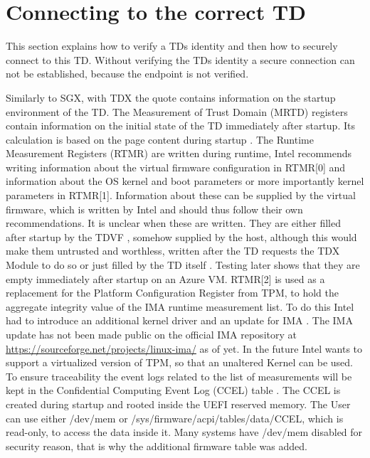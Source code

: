 \section{Connecting to the correct TD}

This section explains how to verify a TDs identity and then how to securely connect to this TD. Without verifying the TDs identity a secure connection can not be established, because the endpoint is not verified.


\label{Identity}
Similarly to \Gls{SGX}, with \Gls{TDX} the quote contains information on the startup environment of the TD. The Measurement of Trust Domain (MRTD) registers contain information on the initial state of the TD immediately after startup. Its calculation is based on the page content during startup \cite{intel_corporation_dcap_2024-1}. The Runtime Measurement Registers (RTMR) are written during runtime, Intel recommends writing information about the virtual firmware configuration in RTMR[0] and information about the OS kernel and boot parameters or more importantly kernel parameters in RTMR[1]. Information about these can be supplied by the virtual firmware, which is written by Intel and should thus follow their own recommendations. It is unclear when these are written. They are either filled after startup by the TDVF \cite{intel_corporation_tdx-virtual-firmware-design-guide-rev-004-20231206pdf_2023}, somehow supplied by the host, although this would make them untrusted and worthless, written after the TD requests the TDX Module to do so \cite{intel_corporation_tdx-virtual-firmware-design-guide-rev-004-20231206pdf_2023} or just filled by the TD itself \cite{noauthor_tdx-module-10-public-specpdf_nodate}. Testing later shows that they are empty immediately after startup on an Azure VM.
RTMR[2] is used as a replacement for the Platform Configuration Register from TPM, to hold the aggregate integrity value of the IMA runtime measurement list. To do this Intel had to introduce an additional kernel driver and an update for IMA \cite{haidong_xia_runtime_integrity_measurement_2024}. The IMA update has not been made public on the official IMA repository at \url{https://sourceforge.net/projects/linux-ima/} as of yet. In the future Intel wants to support a virtualized version of TPM, so that an unaltered Kernel can be used. To ensure traceability the event logs related to the list of measurements will be kept in the Confidential Computing Event Log (CCEL) table \cite{haidong_xia_runtime_integrity_measurement_2024}. The CCEL is created during startup and rooted inside the UEFI reserved memory. The User can use either /dev/mem or /sys/firmware/acpi/tables/data/CCEL, which is read-only, to access the data inside it. Many systems have /dev/mem disabled for security reason, that is why the additional firmware table was added.

